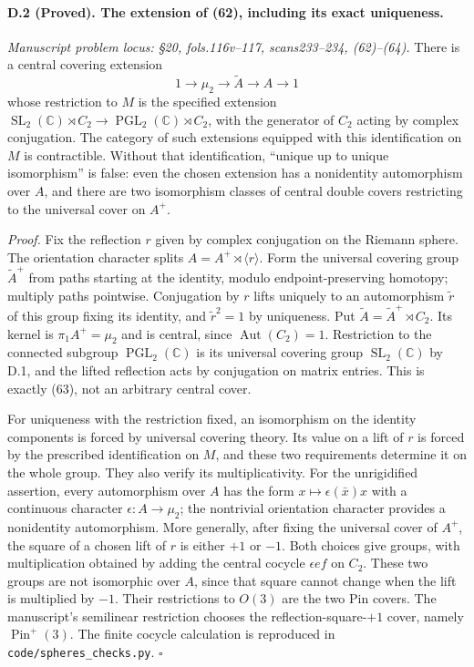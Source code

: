 \paragraph{D.2 (Proved). The extension of (62), including its exact uniqueness.}
\emph{Manuscript problem locus: \S20, fols.116v--117, scans233--234, (62)--(64).}
There is a central covering extension
\[
1\longrightarrow\mu_2\longrightarrow\widetilde A
 \longrightarrow A\longrightarrow1
\]
whose restriction to $M$ is the specified extension
$\operatorname{SL}_2(\mathbb C)\rtimes C_2\longrightarrow
\operatorname{PGL}_2(\mathbb C)\rtimes C_2$, with the generator of $C_2$ acting by complex conjugation. The category of such extensions equipped with this identification on $M$ is contractible. Without that identification, ``unique up to unique isomorphism'' is false: even the chosen extension has a nonidentity automorphism over $A$, and there are two isomorphism classes of central double covers restricting to the universal cover on $A^+$.

\emph{Proof.} Fix the reflection $r$ given by complex conjugation on the Riemann sphere. The orientation character splits $A=A^+\rtimes\langle r\rangle$. Form the universal covering group $\widetilde A^+$ from paths starting at the identity, modulo endpoint-preserving homotopy; multiply paths pointwise. Conjugation by $r$ lifts uniquely to an automorphism $\widetilde r$ of this group fixing its identity, and $\widetilde r^2=1$ by uniqueness. Put $\widetilde A=\widetilde A^+\rtimes C_2$. Its kernel is $\pi_1A^+=\mu_2$ and is central, since $\operatorname{Aut}(C_2)=1$. Restriction to the connected subgroup $\operatorname{PGL}_2(\mathbb C)$ is its universal covering group $\operatorname{SL}_2(\mathbb C)$ by D.1, and the lifted reflection acts by conjugation on matrix entries. This is exactly (63), not an arbitrary central cover.

For uniqueness with the restriction fixed, an isomorphism on the identity components is forced by universal covering theory. Its value on a lift of $r$ is forced by the prescribed identification on $M$, and these two requirements determine it on the whole group. They also verify its multiplicativity. For the unrigidified assertion, every automorphism over $A$ has the form $x\mapsto\epsilon(\bar x)x$ with a continuous character $\epsilon:A\to\mu_2$; the nontrivial orientation character provides a nonidentity automorphism. More generally, after fixing the universal cover of $A^+$, the square of a chosen lift of $r$ is either $+1$ or $-1$. Both choices give groups, with multiplication obtained by adding the central cocycle $\epsilon ef$ on $C_2$. These two groups are not isomorphic over $A$, since that square cannot change when the lift is multiplied by $-1$. Their restrictions to $O(3)$ are the two Pin covers. The manuscript's semilinear restriction chooses the reflection-square-$+1$ cover, namely $\operatorname{Pin}^+(3)$. The finite cocycle calculation is reproduced in \texttt{code/spheres\_checks.py}. \hfill$\square$

